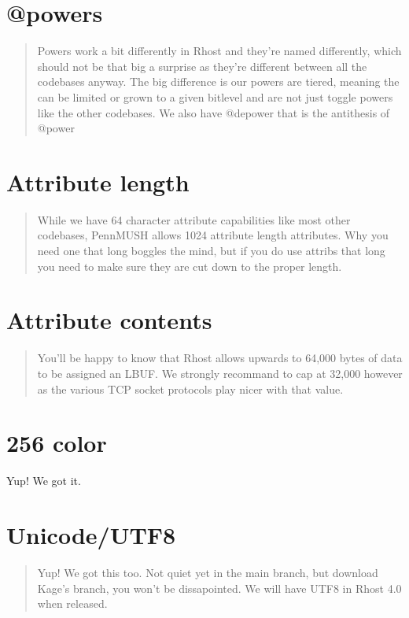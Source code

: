 \documentclass[letterpaper,10pt,english]{sphinxmanual}
\begin{document}
\section{@powers}
\label{\detokenize{10-customize:powers}}\begin{quote}

\sphinxAtStartPar
Powers work a bit differently in Rhost and they’re named
differently, which should not be that big a surprise as they’re different
between all the codebases anyway.  The big difference is our powers are
tiered, meaning the can be limited or grown to a given bitlevel and are
not just toggle powers like the other codebases.  We also have @depower
that is the anti\sphinxhyphen{}thesis of @power
\end{quote}


\section{Attribute length}
\label{\detokenize{10-customize:attribute-length}}\begin{quote}

\sphinxAtStartPar
While we have 64 character attribute capabilities like
most other codebases, PennMUSH allows 1024 attribute length attributes.
Why you need one that long boggles the mind, but if you do use attribs
that long you need to make sure they are cut down to the proper length.
\end{quote}


\section{Attribute contents}
\label{\detokenize{10-customize:attribute-contents}}\begin{quote}

\sphinxAtStartPar
You’ll be happy to know that Rhost allows upwards
to 64,000 bytes of data to be assigned an LBUF.  We strongly recommand
to cap at 32,000 however as the various TCP socket protocols play nicer
with that value.
\end{quote}


\section{256 color}
\label{\detokenize{10-customize:color}}
\sphinxAtStartPar
Yup!  We got it.


\section{Unicode/UTF8}
\label{\detokenize{10-customize:unicode-utf8}}\begin{quote}

\sphinxAtStartPar
Yup!  We got this too.  Not quiet yet in the main branch,
but download Kage’s branch, you won’t be dissapointed.  We will have
UTF8 in Rhost 4.0 when released.
\end{quote}
\end{document}
